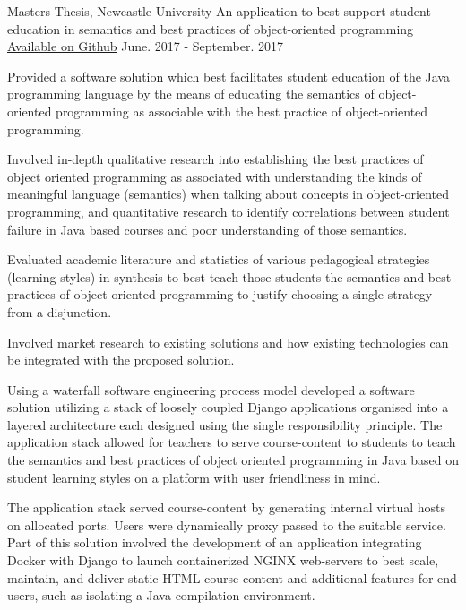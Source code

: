 
\begin{cventries}

  \cventry
    {Masters Thesis, Newcastle University} %
    {An application to best support student education in semantics and best practices of object-oriented programming} %
    {\href{https://github.com/mmacheerpuppy/bark}{Available on Github}} %
    {June. 2017 - September. 2017} %
    {
      \begin{cvitems} %
	\item {Provided a software solution which best facilitates student education of the Java programming language by the means of educating
the semantics of object-oriented programming as associable with the best practice of object-oriented programming.}
  \item {Involved in-depth qualitative research into establishing the best practices of object oriented programming as associated with understanding the kinds of meaningful language (semantics) when talking about concepts in object-oriented programming, and quantitative research to identify correlations between student failure in Java based courses and poor understanding of those semantics.}
  \item{Evaluated academic literature and statistics of various pedagogical strategies (learning styles) in synthesis to best teach those students the semantics and best practices of object oriented programming to justify choosing a single strategy from a disjunction.} 
  \item {Involved market research to existing solutions and how existing technologies can be integrated with the proposed solution.}
  \item{Using a waterfall software engineering process model developed a software solution utilizing a stack of loosely coupled Django applications organised into a layered architecture each designed using the single responsibility principle. The application stack allowed for teachers to serve course-content to students to teach the semantics and best practices of object oriented programming in Java based on student learning styles on a platform with user friendliness in mind.}
  \item{The application stack served course-content by generating internal virtual hosts on allocated ports. Users were dynamically proxy passed to the suitable service. Part of this solution involved the development of an application integrating Docker with Django to launch containerized NGINX web-servers to best scale, maintain, and deliver static-HTML course-content and additional features for end users, such as isolating a Java compilation environment.}
      \end{cvitems}
    }


\end{cventries}
